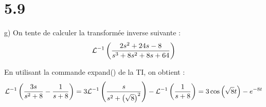 \section*{5.9}

g) On tente de calculer la transformée inverse suivante :
\begin{align*}
    \mathcal{L}^{-1}\left({\dfrac{2s^2+24s-8}{s^3+8s^2+8s+64}}\right)
\end{align*}

En utilisant la commande expand() de la TI, on obtient :
\begin{align*}
    \mathcal{L}^{-1}\left({\dfrac{3s}{s^2+8}-\dfrac{1}{s+8}}\right) =
    3\mathcal{L}^{-1}\left({\dfrac{s}{s^2+\left({\sqrt{8}}\right)^2}}\right)-\mathcal{L}^{-1}\left({\dfrac{1}{s+8}}\right) =
    3\cos\left({\sqrt{8}t}\right)-e^{-8t}
\end{align*}
